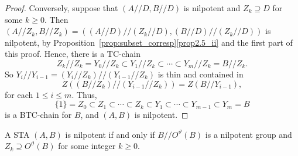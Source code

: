 \begin{proof}
Conversely, suppose that $(A//D, B//D)$ is nilpotent and $Z_k \supseteq
D$ for some $k \geq 0$. Then 
$(A//Z_k, B//Z_k) = ((A//D)//(Z_k//D), (B//D)//(Z_k//D))$ is nilpotent,
by Proposition~\ref{prop:subset_corresp}\ref{prop2.5_ii} and the first part of this
proof. Hence, there is a TC-chain
\[
Z_k//Z_k = Y_0//Z_k \subset Y_1//Z_k \subset \cdots \subset Y_m//Z_k =
B//Z_k.
\]
So $Y_i//Y_{i-1} = (Y_i//Z_k)//(Y_{i-1}//Z_k)$ is thin
and contained in 
\[
Z((B//Z_k)//(Y_{i-1}//Z_k)) = Z(B//Y_{i-1}),
\]
 for each
$1 \leq i \leq m$. Thus,
\[
\{1\} = Z_0 \subset Z_1 \subset \cdots \subset Z_k \subset Y_1 \subset
\cdots \subset Y_{m-1} \subset Y_m = B
\]
is a BTC-chain for $B$, and $(A, B)$ is nilpotent. 
\end{proof}
 
\begin{coro}
\label{cor:nilp_group}
A STA $(A, B)$ is nilpotent if and only if $B//O^{\vartheta}(B)$ is a
nilpotent group and $Z_k \supseteq O^{\vartheta}(B)$ for some integer $k
\geq 0$.
\end{coro}

